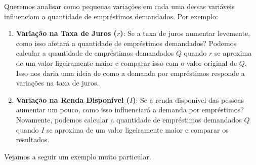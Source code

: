 Queremos analisar como pequenas variações em cada uma dessas variáveis influenciam a quantidade de empréstimos demandados. Por exemplo:
\begin{enumerate}
\item \textbf{Variação na Taxa de Juros (\( r \))}: Se a taxa de juros aumentar levemente, como isso afetará a quantidade de empréstimos demandados? Podemos calcular a quantidade de empréstimos demandados \( Q \) quando \( r \) se aproxima de um valor ligeiramente maior e comparar isso com o valor original de \( Q \). Isso nos daria uma ideia de como a demanda por empréstimos responde a variações na taxa de juros.

\item \textbf{Variação na Renda Disponível (\( I \))}: Se a renda disponível das pessoas aumentar um pouco, como isso influenciará a demanda por empréstimos? Novamente, podemos calcular a quantidade de empréstimos demandados \( Q \) quando \( I \) se aproxima de um valor ligeiramente maior e comparar os resultados.

\end{enumerate}

Vejamos a seguir um exemplo muito particular.

